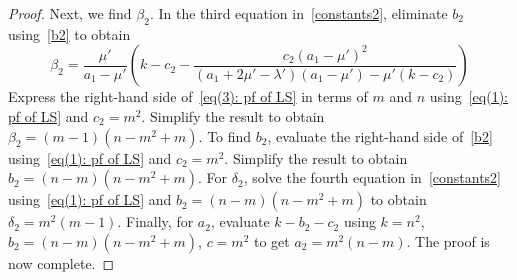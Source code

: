 \begin{proof}
Next, we find $\beta_2$.
In the third equation in~\eqref{constants2}, eliminate $b_2$ using~\eqref{b2} to obtain
\begin{equation}\label{eq(3): pf of LS}
	\beta_2 = \frac{\mu'}{a_1-\mu'} \left( k-c_2 - \frac{c_2(a_1 -\mu')^2}{(a_1 +2\mu' -\lambda')(a_1 -\mu') -\mu'(k-c_2)}\right)
\end{equation} 
Express the right-hand side of~\eqref{eq(3): pf of LS} in terms of $m$ and $n$ using~\eqref{eq(1): pf of LS} and $c_2=m^2$.
Simplify the result to obtain $\beta_2 = (m-1)(n-m^2+m)$.
To find $b_2$, evaluate the right-hand side of~\eqref{b2} using~\eqref{eq(1): pf of LS} and $c_2=m^2$. 
Simplify the result to obtain $b_2=(n-m)(n-m^2+m)$.
For $\delta_2$, solve the fourth equation in~\eqref{constants2} using~\eqref{eq(1): pf of LS} and $b_2=(n-m)(n-m^2+m)$ to obtain $\delta_2 = m^2(m-1)$.
Finally, for $a_2$, evaluate $k-b_2-c_2$ using $k=n^2$, $b_2=(n-m)(n-m^2+m)$, $c=m^2$ to get $a_2=m^2(n-m)$. 
The proof is now complete.
\end{proof}

